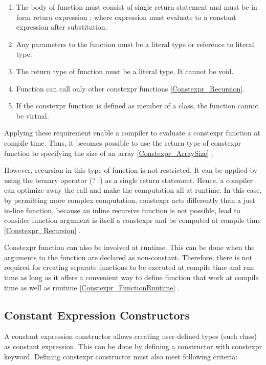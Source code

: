 \documentclass[11pt]{report}
\begin{document}
\begin{enumerate}
\item The body of function must consist of single return statement and must be in form {return expression ;} where expression must evaluate to a constant expression after substitution.

\item Any parameters to the function must be a literal type or reference to literal type.

\item The return type of function must be a literal type. It cannot be void.

\item Function can call only other constexpr functions \ref{Constexpr_Recursion}.

\item If the constexpr function is defined as member of a class, the function cannot be virtual.
\end{enumerate}

Applying these requirement enable a compiler to evaluate a constexpr function at compile time. Thus, it becomes possible to use the return type of constexpr function to specifying the size of an array \ref{Constexpr_ArraySize} \cite{Gregorie:professionalcpp}.

However, recursion in this type of function is not restricted. It can be applied by using the ternary operator (? :) as a single return statement. Hence, a compiler can optimize away the call and make the computation all at runtime. In this case, by permitting more complex computation, constexpr acts differently than a just in-line function, because an inline recursive function is not possible, lead to consider function argument is itself a constexpr and be computed at compile time \ref{Constexpr_Recursion} \cite{Allain:2011:FutureCpp}.
\newline

Constexpr function can also be involved at runtime. This can be done when the arguments to the function are declared as non-constant. Therefore, there is not required for creating separate functions to be executed at compile time and run time as long as it offers a convenient way to define function that work at compile time as well as runtime \ref{Constexpr_FunctionRuntime} \cite{Allain:2011:FutureCpp}.

\subsection{Constant Expression Constructors}
\label{subsection: Constant Expression Constructors}
A constant expression constructor allows creating user-defined types (such class) as constant expression. This can be done by defining a constructor with constexpr keyword. Defining constexpr constructor must also meet following criteria:
\end{document}
